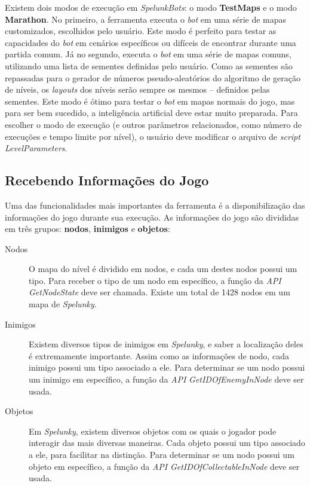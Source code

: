 Existem dois modos de execução em \textit{SpelunkBots}: o modo \textbf{TestMaps}
e o modo \textbf{Marathon}. No primeiro, a ferramenta executa o \textit{bot} em
uma série de mapas customizados, escolhidos pelo usuário. Este modo é perfeito
para testar as capacidades do \textit{bot} em cenários específicos ou difíceis
de encontrar durante uma partida comum. Já no segundo, executa o \textit{bot} em
uma série de mapas comuns, utilizando uma lista de sementes definidas pelo
usuário. Como as sementes são repassadas para o gerador de números
pseudo-aleatórios do algoritmo de geração de níveis, os \textit{layouts} dos
níveis serão sempre os mesmos -- definidos pelas sementes. Este modo é ótimo
para testar o \textit{bot} em mapas normais do jogo, mas para ser bem sucedido,
a inteligência artificial deve estar muito preparada. Para escolher o modo de
execução (e outros parâmetros relacionados, como número de execuções e tempo
limite por nível), o usuário deve modificar o arquivo de \textit{script}
\textit{LevelParameters}.


\subsection{Recebendo Informações do Jogo}
Uma das funcionalidades mais importantes da ferramenta é a disponibilização das
informações do jogo durante sua execução. As informações do jogo são divididas
em três grupos: \textbf{nodos}, \textbf{inimigos} e \textbf{objetos}:

\begin{description}
	\item[Nodos]
		O mapa do nível é dividido em nodos, e cada um destes nodos possui um
		tipo.  Para receber o tipo de um nodo em específico, a função da
		\textit{API} \textit{GetNodeState} deve ser chamada. Existe um total de
		1428 nodos em um mapa de \textit{Spelunky}.

	\item[Inimigos]
		Existem diversos tipos de inimigos em \textit{Spelunky}, e saber a
		localização deles é extremamente importante. Assim como as informações
		de nodo, cada inimigo possui um tipo associado a ele. Para determinar se
		um nodo possui um inimigo em específico, a função da \textit{API}
		\textit{GetIDOfEnemyInNode} deve ser usada.

	\item[Objetos]
		Em \textit{Spelunky}, existem diversos objetos com os quais o jogador
		pode interagir das mais diversas maneiras. Cada objeto possui um tipo
		associado a ele, para facilitar na distinção. Para determinar se um nodo
		possui um objeto em específico, a função da \textit{API}
		\textit{GetIDOfCollectableInNode} deve ser usada.
\end{description}

